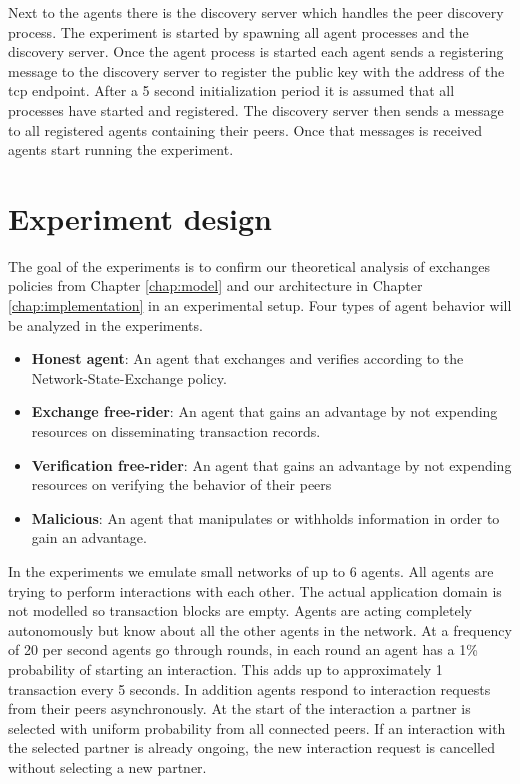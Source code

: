 Next to the agents there is the discovery server which handles the peer discovery process. The 
experiment is started by spawning all agent processes and the discovery server. Once the agent 
process is started each agent sends a registering message to the discovery server to register the 
public key with the address of the tcp endpoint. After a 5 second initialization period it is assumed
that all processes have started and registered. The discovery server then sends a message to all 
registered agents containing their peers. Once that messages is received agents start running the
experiment. 

\section{Experiment design}
The goal of the experiments is to confirm our theoretical analysis of exchanges policies from Chapter 
\ref{chap:model} and our architecture in Chapter \ref{chap:implementation} in an experimental setup.
Four types of agent behavior will be analyzed in the experiments.

\begin{itemize}
    \item \textbf{Honest agent}: An agent that exchanges and verifies according to the Network-State-Exchange
    policy.
    \item \textbf{Exchange free-rider}: An agent that gains an advantage by not 
    expending resources on disseminating transaction records.
    \item \textbf{Verification free-rider}: An agent that gains an advantage by not expending 
    resources on verifying the behavior of their peers
    \item \textbf{Malicious}: An agent that manipulates or withholds information in order to gain an
    advantage. 
\end{itemize}


In the experiments we emulate small networks of up to 6 agents. All agents are trying to perform 
interactions with each other. The actual application domain is not modelled so transaction blocks 
are empty. Agents are acting completely autonomously but know about all the other agents in the network. 
At a frequency of 20 per second agents go through rounds, in each round an agent has a 1\% probability 
of starting an interaction. This adds up to approximately 1 transaction every 5 seconds. In addition 
agents respond to interaction requests from their peers asynchronously. 
At the start of the interaction a partner is selected with uniform probability from all connected peers. If an interaction with 
the selected partner is already ongoing, the new interaction request is cancelled without selecting a new partner. 

